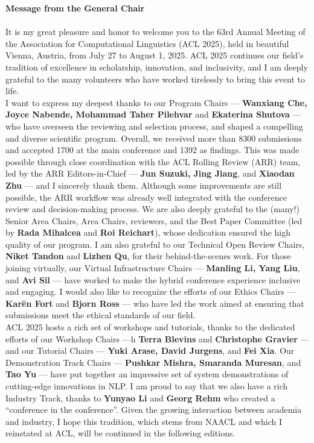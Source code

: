 \textbf{Message from the General Chair}\\
\\

It is my great pleasure and honor to welcome you to the 63rd Annual Meeting of the Association for Computational Linguistics (ACL 2025), held in beautiful Vienna, Austria, from July 27 to August 1, 2025. ACL 2025 continues our field’s tradition of excellence in scholarship, innovation, and inclusivity, and I am deeply grateful to the many volunteers who have worked tirelessly to bring this event to life.\\


I want to express my deepest thanks to our Program Chairs	--- \textbf{Wanxiang Che, Joyce Nabende, Mohammad Taher Pilehvar} and \textbf{Ekaterina Shutova} --- who have overseen the reviewing and selection process, and shaped a compelling and diverse scientific program. Overall, we received more than 8300 submissions and accepted 1700 at the main conference and 1392 as findings. This was made possible through close coordination with the ACL Rolling Review (ARR) team, led by the ARR Editors-in-Chief --- \textbf{Jun Suzuki, Jing Jiang}, and \textbf{Xiaodan Zhu} --- and I sincerely thank them. Although some improvements are still possible, the ARR workflow was already well integrated with the conference review and decision-making process. We are also deeply grateful to the (many!) Senior Area Chairs, Area Chairs, reviewers, and the Best Paper Committee (led by \textbf{Rada Mihalcea} and \textbf{Roi Reichart}), whose dedication ensured the high quality of our program. I am also grateful to our Technical Open Review Chairs, \textbf{Niket Tandon} and \textbf{Lizhen Qu}, for their behind-the-scenes work. For those joining virtually, our Virtual Infrastructure Chairs --- \textbf{Manling Li, Yang Liu}, and \textbf{Avi Sil} --- have worked to make the hybrid conference experience inclusive and engaging. I would also like to recognize the efforts of our Ethics Chairs --- \textbf{Karën Fort} and \textbf{Bjorn Ross} --- who have led the work aimed at ensuring that submissions meet the ethical standards of our field. \\


ACL 2025 hosts a rich set of workshops and tutorials, thanks to the dedicated efforts of our Workshop Chairs 	---h \textbf{Terra Blevins} and \textbf{Christophe Gravier} --- and our Tutorial Chairs --- \textbf{Yuki Arase, David Jurgens}, and \textbf{Fei Xia}. Our Demonstration Track Chairs --- \textbf{Pushkar Mishra, Smaranda Muresan}, and \textbf{Tao Yu} --- have put together an impressive set of system demonstrations of cutting-edge innovations in NLP. I am proud to say that we also have a rich Industry Track, thanks to \textbf{Yunyao Li} and \textbf{Georg Rehm} who created a “conference in the conference”. Given the growing interaction between academia and industry, I hope this tradition, which stems from NAACL and which I reinstated at ACL, will be continued in the following editions.\\


